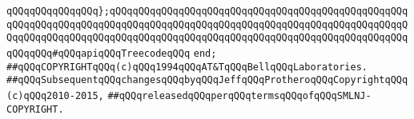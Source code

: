 \verb|qQQqqQQqqQQqqQQq};qQQqqQQqqQQqqQQqqQQqqQQqqQQqqQQqqQQqqQQqqQQqqQQqqQQqqQQqqQQqqQQqqQQqqQQqqQQqqQQqqQQqqQQqqQQqqQQqqQQqqQQqqQQqqQQqqQQqqQQqqQQqqQQqqQQqqQQqqQQqqQQqqQQqqQQqqQQqqQQqqQQqqQQqqQQqqQQqqQQqqQQqqQQqqQQqqQQqqQQq#qQQqapiqQQqTreecodeqQQq|\newline
\verb|end;|\newline
\newline
\verb|##qQQqCOPYRIGHTqQQq(c)qQQq1994qQQqAT&TqQQqBellqQQqLaboratories.|\newline
\verb|##qQQqSubsequentqQQqchangesqQQqbyqQQqJeffqQQqProtheroqQQqCopyrightqQQq(c)qQQq2010-2015,|\newline
\verb|##qQQqreleasedqQQqperqQQqtermsqQQqofqQQqSMLNJ-COPYRIGHT.|\newline

